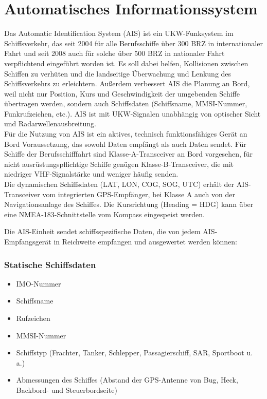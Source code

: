 \section{Automatisches Informationssystem}\label{s.Automatisches Informationssystem (AIS)}
Das Automatic Identification System (AIS) ist ein UKW-Funksystem im Schiffsverkehr, das seit 2004 für alle Berufsschiffe über 300 BRZ in internationaler Fahrt und seit 2008 auch für solche über 500 BRZ in nationaler Fahrt verpflichtend eingeführt worden ist. Es soll dabei helfen, Kollisionen zwischen Schiffen zu verhüten und die landseitige Überwachung und Lenkung des Schiffsverkehrs zu erleichtern. Außerdem verbessert AIS die Planung an Bord, weil nicht nur Position, Kurs und Geschwindigkeit der umgebenden Schiffe übertragen werden, sondern auch Schiffsdaten (Schiffsname, MMSI-Nummer, Funkrufzeichen, etc.). AIS ist mit UKW-Signalen unabhängig von optischer Sicht und Radarwellenausbreitung.\\
Für die Nutzung von AIS ist ein aktives, technisch funktionsfähiges Gerät an Bord Voraussetzung, das sowohl Daten empfängt als auch Daten sendet. Für Schiffe der Berufsschifffahrt sind Klasse-A-Transceiver an Bord vorgesehen, für nicht ausrüstungspflichtige Schiffe genügen Klasse-B-Transceiver, die mit niedriger VHF-Signalstärke und weniger häufig senden.  \\
Die dynamischen Schiffsdaten (LAT, LON, COG, SOG, UTC) erhält der AIS-Transceiver vom integrierten GPS-Empfänger, bei Klasse A auch von der Navigationsanlage des Schiffes. Die Kursrichtung (Heading =  HDG) kann über eine NMEA-183-Schnittstelle vom Kompass eingespeist werden.

Die AIS-Einheit sendet schiffsspezifische Daten, die von jedem AIS-Empfangsgerät in Reichweite empfangen und ausgewertet werden können:
\subsubsection{Statische Schiffsdaten} \label{Statische Schiffsdaten}
\begin{itemize}
\item IMO-Nummer
\item Schiffsname
\item Rufzeichen
\item MMSI-Nummer
\item Schiffstyp (Frachter, Tanker, Schlepper, Passagierschiff, SAR, Sportboot u. a.)
\item Abmessungen des Schiffes (Abstand der GPS-Antenne von Bug, Heck, Backbord- und Steuerbordseite)
\end{itemize}

